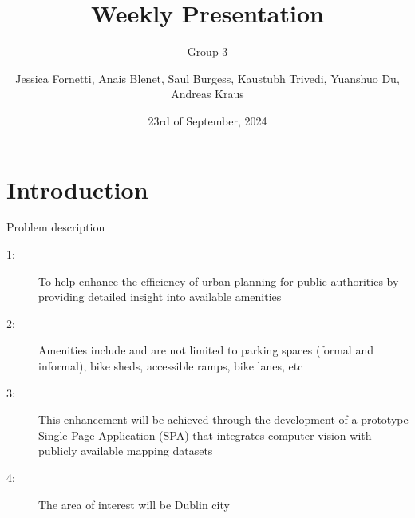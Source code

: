 \documentclass{beamer}
\title[Weekly Presentation]{Weekly Presentation}
\subtitle{Group 3}
\author{Jessica Fornetti, Anais Blenet, Saul Burgess, Kaustubh Trivedi, Yuanshuo Du, Andreas Kraus}
\institute{TU Dublin}
\date{23rd of September, 2024} %
\begin{document}
\begin{frame}
    \titlepage{}
\end{frame}

\section{Introduction}

\begin{frame}{Problem description}  %
    \begin{description}
        \item[1:] To help enhance the efficiency of urban planning for public authorities by providing detailed insight into available amenities
        \item[2:] Amenities include and are not limited to parking spaces (formal and informal), bike sheds, accessible ramps, bike lanes, etc
        \item[3:] This enhancement will be achieved through the development of a prototype Single Page Application (SPA) that integrates computer vision with publicly available mapping datasets 
        \item[4:] The area of interest will be Dublin city 
    \end{description}
\end{frame}
\end{document}
